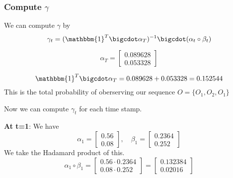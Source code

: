 \subsubsection{Compute $\gamma$}
We can compute $\gamma$ by 
\[
\gamma_t = (\mathbbm{1}^T \bigcdot \alpha_T)^{-1} \bigcdot (\alpha_t \circ \beta_t)
\]

\[
\alpha_T = 
    \begin{bmatrix}
        0.089628 \\ 0.053328
    \end{bmatrix}
\]

\[
    \mathbbm{1}^T \bigcdot \alpha_T = 0.089628 + 0.053328 = 0.152544
\]
This is the total probability of oberserving our sequence $O = \{O_1, O_2, O_1\}$

Now we can compute $\gamma_t$ for each time stamp.

\textbf{At t=1}:
We have 
\[
    \alpha_1 = \begin{bmatrix}
        0.56 \\ 0.08
    \end{bmatrix}, \quad \beta_1 = \begin{bmatrix}
        0.2364 \\ 0.252
    \end{bmatrix}
\]
We take the Hadamard product of this.
\[
\alpha_1 \circ \beta_1 = \begin{bmatrix}
    0.56 \cdot 0.2364 \\ 0.08 \cdot 0.252 
\end{bmatrix} = \begin{bmatrix}
    0.132384 \\ 0.02016
\end{bmatrix}
\]

